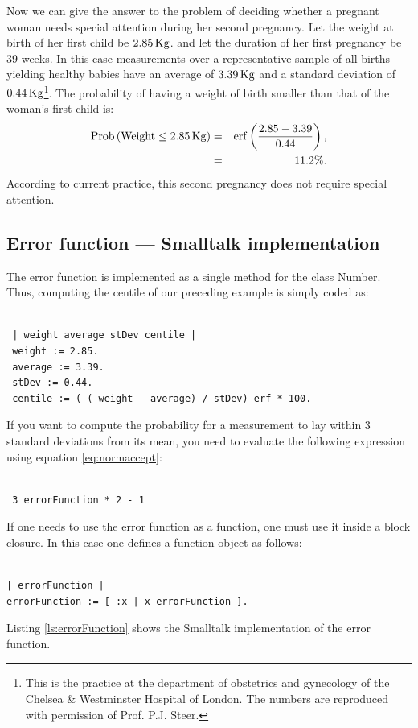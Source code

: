 \documentclass[twoside]{book}
\begin{document}
\def\w{2.85}\def\av{3.39}\def\st{0.44}
 Now we can give the answer to the problem of deciding
whether a pregnant woman needs special attention during her second
pregnancy. Let the weight at birth of her first child be $\w\kg$.
and let the duration of her first pregnancy be 39 weeks. In this
case measurements over a representative sample of all births
yielding healthy babies have an average of $\av\kg$ and a standard
deviation of $\st\kg$\footnote{\label{ft:steer}This is the
practice at the department of obstetrics and gynecology of the
Chelsea $\&$ Westminster Hospital of London. The numbers are
reproduced with permission of Prof. P.J. Steer.}. The probability
of having a weight of birth smaller than that of the woman's first
child is:
\begin{eqnarray*}
\prob\left(\mathop{\rm Weight}\le \w\kg \right) & = &
\erf\left({\w-\av\over\st}\right),\\ & = & 11.2\%.
\end{eqnarray*}
According to current practice, this second pregnancy does not
require special attention.

\subsection{Error function --- Smalltalk implementation}
\label{sec:sterrorfunction}  The error function is
implemented as a single method for the class Number. Thus,
computing the centile of our preceding example is simply coded as:
\begin{codeExample}
\begin{verbatim}

 | weight average stDev centile |
 weight := 2.85.
 average := 3.39.
 stDev := 0.44.
 centile := ( ( weight - average) / stDev) erf * 100.
\end{verbatim}
\end{codeExample}
If you want to compute the probability for a measurement to lay
within 3 standard deviations from its mean, you need to evaluate
the following expression using equation \ref{eq:normaccept}:
\begin{codeExample}
\begin{verbatim}

 3 errorFunction * 2 - 1
\end{verbatim}
\end{codeExample}
If one needs to use the error function as a function, one must use
it inside a block closure. In this case one defines a function
object as follows:
\begin{codeExample}
\begin{verbatim}

| errorFunction |
errorFunction := [ :x | x errorFunction ].
\end{verbatim}
\end{codeExample}
Listing \ref{ls:errorFunction} shows the Smalltalk implementation
of the error function.
\end{document}
